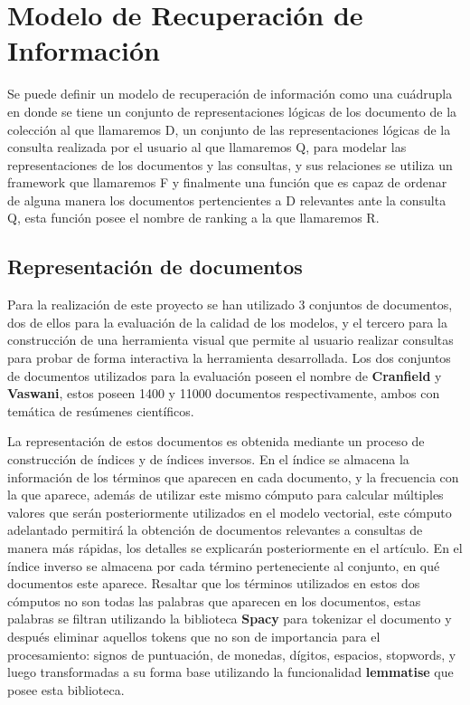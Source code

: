 \documentclass{llncs}
\begin{document}
\section{Modelo de Recuperación de Información}

Se puede definir un modelo de recuperación de información como una cuádrupla en donde se tiene un conjunto de representaciones lógicas de los documento de la colección al que llamaremos D, un conjunto de las representaciones lógicas de la consulta realizada por el usuario al que llamaremos Q, para modelar las representaciones de los documentos y las consultas, y sus relaciones se utiliza un framework que llamaremos F y finalmente una función que es capaz de ordenar de alguna manera los documentos pertencientes a D relevantes ante la consulta Q, esta función posee el nombre de ranking a la que llamaremos R.

\subsection{Representación de documentos}

Para la realización de este proyecto se han utilizado 3 conjuntos de documentos, dos de ellos para la evaluación de la calidad de los modelos, y el tercero para la construcción de una herramienta visual que permite al usuario realizar consultas para probar de forma interactiva la herramienta desarrollada. Los dos conjuntos de documentos utilizados para la evaluación poseen el nombre de {\bfseries Cranfield} y {\bfseries Vaswani}, estos poseen 1400 y 11000 documentos respectivamente, ambos con temática de resúmenes científicos.

La representación de estos documentos es obtenida mediante un proceso de construcción de índices y de índices inversos. En el índice se almacena la información de los términos que aparecen en cada documento, y la frecuencia con la que aparece, además de utilizar este mismo cómputo para calcular múltiples valores que serán posteriormente utilizados en el modelo vectorial, este cómputo adelantado permitirá la obtención de documentos relevantes a consultas de manera más rápidas, los detalles se explicarán posteriormente en el artículo. En el índice inverso se almacena por cada término perteneciente al conjunto, en qué documentos este aparece. Resaltar que los términos utilizados en estos dos cómputos no son todas las palabras que aparecen en los documentos, estas palabras se filtran utilizando la biblioteca {\bfseries Spacy} para tokenizar el documento y después eliminar aquellos tokens que no son de importancia para el procesamiento: signos de puntuación, de monedas, dígitos, espacios, stopwords, y luego transformadas a su forma base utilizando la funcionalidad {\bfseries lemmatise} que posee esta biblioteca.
\end{document}
